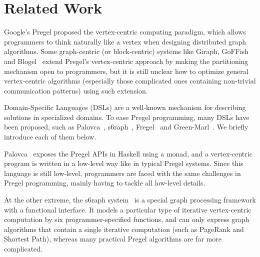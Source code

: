 \documentclass{sokendai_thesis} %
\newcommand{\plus}{\raisebox{.25ex}{\scalebox{.8}{+}}}
\begin{document}

\chapter{Related Work}

Google's Pregel \cite{pregel} proposed the vertex-centric computing paradigm, which allows programmers to think naturally like a vertex when designing distributed graph algorithms.
Some graph-centric (or block-centric) systems like Giraph\plus\cite{thinkgraph}, GoFFish~\cite{goffish} and Blogel~\cite{blogel} extend Pregel's vertex-centric approach by making the partitioning mechanism open to programmers, but it is still unclear how to optimize general vertex-centric algorithms (especially those complicated ones containing non-trivial communication patterns) using such extension.

Domain-Specific Languages (DSLs) are a well-known mechanism for describing solutions in specialized domains.
To ease Pregel programming, many DSLs have been proposed, such as Palovca~\cite{palovca}, s6raph~\cite{s6raph}, Fregel~\cite{fregel} and Green-Marl~\cite{green14}.
We briefly introduce each of them below.

Palovca~\cite{palovca} exposes the Pregel APIs in Haskell using a monad, and a vertex-centric program is written in a low-level way like in typical Pregel systems.
Since this language is still low-level, programmers are faced with the same challenges in Pregel programming, mainly having to tackle all low-level details.

At the other extreme, the s6raph system~\cite{s6raph} is a special graph processing framework with a functional interface.
It models a particular type of iterative vertex-centric computation by six programmer-specified functions, and can only express graph algorithms that contain a single iterative computation (such as PageRank and Shortest Path), whereas many practical Pregel algorithms are far more complicated.
\end{document}

